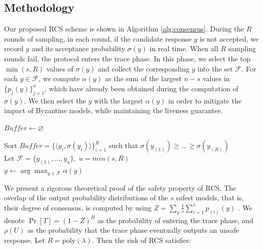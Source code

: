 \documentclass[11pt]{article}
\begin{document}
\subsection{Methodology}
Our proposed RCS scheme is shown in Algorithm \ref{alg:consensus}. During the $R$ rounds of sampling, in each round, if the candidate response $y$ is not accepted, we record $y$ and its acceptance probability $\sigma(y)$ in real time. When all $R$ sampling rounds fail, the protocol enters the trace phase. In this phase, we select the top $\min(s, R)$ values of $\sigma(y)$ and collect the corresponding $y$ into the set $\mathcal{F}$. For each $y \in \mathcal{F}$, we compute $\alpha(y)$ as the sum of the largest $n - s$ values in $\{p_j(y)\}_{j=1}^{n}$, which have already been obtained during the computation of $\sigma(y)$. We then select the $y$ with the largest $\alpha(y)$ in order to mitigate the impact of Byzantine models, while maintaining the liveness guarantee.


\begin{algorithm}[t]
\SetAlgoLined
{}

$Buffer \gets \varnothing$\\

Sort $Buffer=\{\langle y_i, \sigma(y_i) \rangle \}_{i=1}^{R}$ 
 such that $\sigma(y_{(1)}) \ge \dots \ge \sigma(y_{(R)})$\\
Let $\mathcal{F} = \{y_{(1)}, \dots, y_{u}\}, \; u= min(s,R)$ \\
\Return $y \gets \arg\max_{y \in \mathcal{F}} \alpha(y)$

\caption{Reliable Consensus Sampling Algorithm}
\label{alg:consensus}
\end{algorithm}



We present a rigorous theoretical proof of the safety property of RCS. The overlap of the output probability distributions of the $s$ safest models, that is, their degree of consensus, is computed by using $Z = \sum_{y}\frac{1}{s}\sum_{i=1}^{s}p_{(i)}(y)$ \citep{kalai2025consensus}. We denote $\Pr[T]=(1-Z)^R$ as the probability of entering the trace phase, and $\rho(U)$ as the probability that the trace phase eventually outputs an unsafe response. Let $R = \mathrm{poly}(\lambda)$. Then the risk of RCS satisfies:
\end{document}
